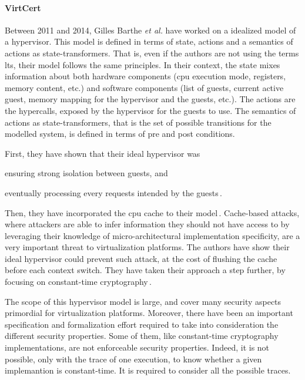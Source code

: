 \paragraph{VirtCert}
%
Between 2011 and 2014, Gilles Barthe \emph{et al.} have worked on a idealized
model of a hypervisor.
%
This model is defined in terms of state, actions and a semantics of actions as
state-transformers.
%
That is, even if the authors are not using the terms \ac{lts}, their model
follows the same principles.
%
In their context, the state mixes information about both hardware components
(\ac{cpu} execution mode, registers, memory content, etc.) and software
components (list of guests, current active guest, memory mapping for the
hypervisor and the guests, etc.).
%
The actions are the hypercalls, exposed by the hypervisor for the guests to use.
%
The semantics of actions as state-transformers, that is the set of possible
transitions for the modelled system, is defined in terms of pre and post
conditions.

First, they have shown that their ideal hypervisor was
%
\begin{inparaenum}[(1)]
\item ensuring strong isolation between guests, and
%
\item eventually processing every requests intended by the
  guests\,\cite{barthe2011virtcert1}.
\end{inparaenum}
%
Then, they have incorporated the \ac{cpu} cache to their
model\,\cite{barthe2012virtcert2}.
%
Cache-based attacks, where attackers are able to infer information they should
not have access to by leveraging their knowledge of micro-architectural
implementation specificity, are a very important threat to virtualization
platforms.
%
The authors have show their ideal hypervisor could prevent such attack, at the
cost of flushing the cache before each context switch.
%
They have taken their approach a step further, by focusing on constant-time
cryptography\,\cite{barthe2014virtcert3}.

The scope of this hypervisor model is large, and cover many security aspects
primordial for virtualization platforms.
%
Moreover, there have been an important specification and formalization effort
required to take into consideration the different security properties.
%
Some of them, like constant-time cryptography implementations, are not
enforceable security properties.
%
Indeed, it is not possible, only with the trace of one execution, to know
whether a given implemantion is constant-time.
%
It is required to consider all the possible traces.


